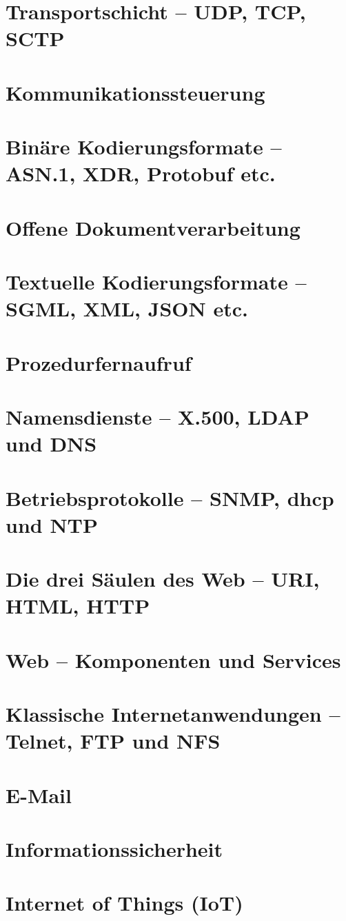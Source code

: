 \documentclass[hidelinks]{article}
\begin{document}
\section{Transportschicht -- UDP, TCP, SCTP}

\section{Kommunikationssteuerung}

\section{Binäre Kodierungsformate -- ASN.1, XDR, Protobuf etc.}

\section{Offene Dokumentverarbeitung}

\section{Textuelle Kodierungsformate -- SGML, XML, JSON etc.}

\section{Prozedurfernaufruf}

\section{Namensdienste -- X.500, LDAP und DNS}

\section{Betriebsprotokolle -- SNMP, dhcp und NTP}

\section{Die drei Säulen des Web -- URI, HTML, HTTP}

\section{Web -- Komponenten und Services}

\section{Klassische Internetanwendungen -- Telnet, FTP und NFS}

\section{E-Mail}

\section{Informationssicherheit}

\section{Internet of Things (IoT)}
\end{document}
